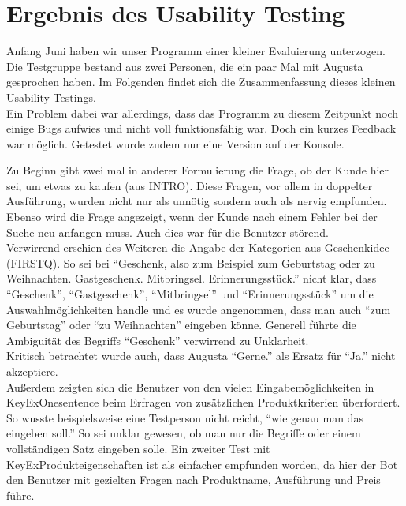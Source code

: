\chapter{Ergebnis des Usability Testing}
\label{sec:UsabilityTesting}

Anfang Juni haben wir unser Programm einer kleiner Evaluierung unterzogen. Die Testgruppe bestand aus zwei Personen, die ein paar Mal mit Augusta gesprochen haben. Im Folgenden findet sich die Zusammenfassung dieses kleinen Usability Testings.\\
Ein Problem dabei war allerdings, dass das Programm zu diesem Zeitpunkt noch einige Bugs aufwies und nicht voll funktionsfähig war. Doch ein kurzes Feedback war möglich. Getestet wurde zudem nur eine Version auf der Konsole.
\vspace{10pt}


Zu Beginn gibt zwei mal in anderer Formulierung die Frage, ob der Kunde hier sei, um etwas zu kaufen (aus INTRO). Diese Fragen, vor allem in doppelter Ausführung, wurden nicht nur als unnötig sondern auch als nervig empfunden. Ebenso wird die Frage angezeigt, wenn der Kunde nach einem Fehler bei der Suche neu anfangen muss. Auch dies war für die Benutzer störend. \\
Verwirrend erschien des Weiteren die Angabe der Kategorien aus Geschenkidee (FIRSTQ). So sei bei "`Geschenk, also zum Beispiel zum Geburtstag oder zu Weihnachten. Gastgeschenk. Mitbringsel. Erinnerungsstück."' nicht klar, dass "`Geschenk"', "`Gastgeschenk"', "`Mitbringsel"' und "`Erinnerungsstück"' um die Auswahlmöglichkeiten handle und es wurde angenommen, dass man auch "`zum Geburtstag"' oder "`zu Weihnachten"' eingeben könne. Generell führte die Ambiguität des Begriffs "`Geschenk"' verwirrend zu Unklarheit.\\
Kritisch betrachtet wurde auch, dass Augusta "`Gerne."' als Ersatz für "`Ja."' nicht akzeptiere.\\
Außerdem zeigten sich die Benutzer von den vielen Eingabemöglichkeiten in KeyExOnesentence beim Erfragen von zusätzlichen Produktkriterien überfordert. So wusste beispielsweise eine Testperson nicht reicht, "`wie genau man das eingeben soll."' So sei unklar gewesen, ob man nur die Begriffe oder einem vollständigen Satz eingeben solle. Ein zweiter Test mit KeyExProdukteigenschaften ist als einfacher empfunden worden, da hier der Bot den Benutzer mit gezielten Fragen nach Produktname, Ausführung und Preis führe.
\vspace{10pt}


